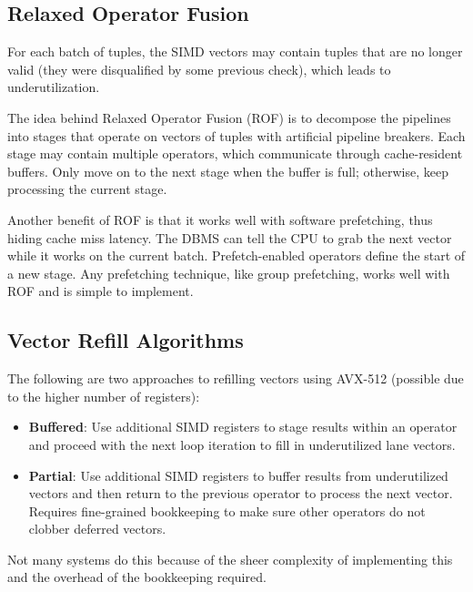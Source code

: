 \documentclass[11pt]{article}
\begin{document}
\subsection{Relaxed Operator Fusion \cite{10.14778/3151113.3151114}}
For each batch of tuples, the SIMD vectors may contain tuples that are no longer valid (they were disqualified by some previous check), which leads to underutilization.

The idea behind Relaxed Operator Fusion (ROF) is to decompose the pipelines into stages that operate on vectors of tuples with artificial pipeline breakers. Each stage may contain multiple operators, which communicate through cache-resident buffers. Only move on to the next stage when the buffer is full; otherwise, keep processing the current stage.

Another benefit of ROF is that it works well with software prefetching, thus hiding cache miss latency. The DBMS can tell the CPU to grab the next vector while it works on the current batch. Prefetch-enabled operators define the start of a new stage. Any prefetching technique, like group prefetching, works well with ROF and is simple to implement.

\subsection{Vector Refill Algorithms }
The following are two approaches to refilling vectors using AVX-512 (possible due to the higher number of registers): 
\begin{itemize}
    \item \textbf{Buffered}: Use additional SIMD registers to stage results within an operator and proceed with the next loop iteration to fill in
underutilized lane vectors.
    \item \textbf{Partial}: Use additional SIMD registers to buffer results from underutilized vectors and then return to the previous operator
to process the next vector. Requires fine-grained bookkeeping to make sure other operators do not clobber deferred vectors.
\end{itemize}
Not many systems do this because of the sheer complexity of implementing this and the overhead of the bookkeeping required.
\end{document}
